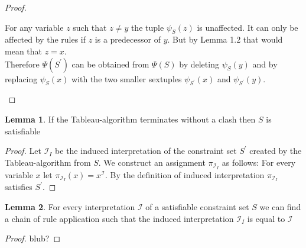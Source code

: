 \documentclass[a4paper,11pt]{scrartcl}
\theoremstyle{break}
\theoremstyle{definition}
\newtheorem{mylem}{Lemma}
\begin{document}
\begin{proof}
\begin{enumerate}
For any variable $z$ such that $z\neq y$ the tuple $\psi_S(z)$ is unaffected. It can only be affected by the rules if $z$ is a predecessor of $y$. But by Lemma 1.2 that would mean that $z=x$.\\
Therefore $\Psi(S^\prime)$ can be obtained from $\Psi(S)$ by deleting $\psi_S(y)$ and by replacing $\psi_S(x)$ with the two smaller sextuples $\psi_{S^\prime}(x)$ and $\psi_{S^\prime}(y)$.
\end{enumerate}
\end{proof}
\begin{mylem}
If the Tableau-algorithm terminates without a clash then $S$ is satisfiable
\end{mylem}
\begin{proof}
Let $\mathcal{I}_I$ be the induced interpretation of the constraint set $S^\prime$ created by the Tableau-algorithm from $S$. We construct an assignment $\pi_{\mathcal{I}_I}$ as follows: For every variable $x$ let $\pi_{\mathcal{I}_I}(x)=x^\mathcal{I}$. By the definition of induced interpretation $\pi_{\mathcal{I}_I}$ satisfies $S^\prime$.
\end{proof}
\begin{mylem}
For every interpretation $\mathcal{I}$ of a satisfiable constraint set $S$ we can find a chain of rule application such that the induced interpretation $\mathcal{I}_I$ is equal to $\mathcal{I}$
\end{mylem}
\begin{proof}
blub?
\end{proof}
\end{document}
